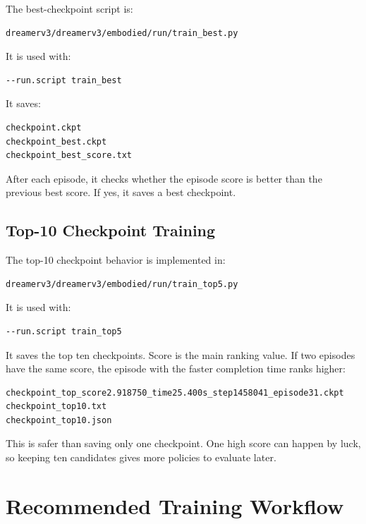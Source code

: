 \documentclass[11pt]{article}
\begin{document}
The best-checkpoint script is:

\begin{lstlisting}
dreamerv3/dreamerv3/embodied/run/train_best.py
\end{lstlisting}

It is used with:

\begin{lstlisting}
--run.script train_best
\end{lstlisting}

It saves:

\begin{lstlisting}
checkpoint.ckpt
checkpoint_best.ckpt
checkpoint_best_score.txt
\end{lstlisting}

After each episode, it checks whether the episode score is better than the previous best score. If yes, it saves a best checkpoint.

\subsection{Top-10 Checkpoint Training}

The top-10 checkpoint behavior is implemented in:

\begin{lstlisting}
dreamerv3/dreamerv3/embodied/run/train_top5.py
\end{lstlisting}

It is used with:

\begin{lstlisting}
--run.script train_top5
\end{lstlisting}

It saves the top ten checkpoints. Score is the main ranking value. If two
episodes have the same score, the episode with the faster completion time ranks
higher:

\begin{lstlisting}
checkpoint_top_score2.918750_time25.400s_step1458041_episode31.ckpt
checkpoint_top10.txt
checkpoint_top10.json
\end{lstlisting}

This is safer than saving only one checkpoint. One high score can happen by
luck, so keeping ten candidates gives more policies to evaluate later.

\section{Recommended Training Workflow}
\end{document}
